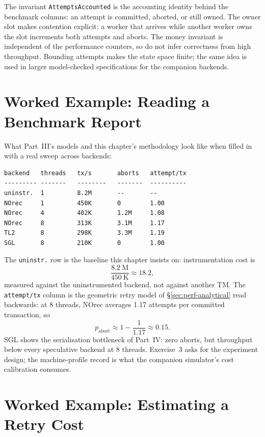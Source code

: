 The invariant \texttt{AttemptsAccounted} is the accounting identity behind the benchmark columns: an attempt is committed, aborted, or still owned. The owner slot makes contention explicit: a worker that arrives while another worker owns the slot increments both attempts and aborts. The money invariant is independent of the performance counters, so do not infer correctness from high throughput. Bounding attempts makes the state space finite; the same idea is used in larger model-checked specifications for the companion backends.

\section{Worked Example: Reading a Benchmark Report}
\label{sec:perf-example}

What Part~III's models and this chapter's methodology look like when filled in
with a real sweep across backends:

\begin{lstlisting}[caption={A protocol for separating instrumentation cost from contention.}]
backend   threads   tx/s       aborts   attempt/tx
--------- -------   --------   -------  ----------
uninstr.  1         8.2M       --       --
NOrec     1         450K       0        1.00
NOrec     4         402K       1.2M     1.08
NOrec     8         313K       3.1M     1.17
TL2       8         298K       3.3M     1.19
SGL       8         210K       0        1.00
\end{lstlisting}

The \texttt{uninstr.} row is the baseline this chapter insists on: instrumentation cost is
$$
\frac{8.2\ \mathrm{M}}{450\ \mathrm{K}} \approx 18.2,
$$
measured against the uninstrumented backend, not against another TM. The \texttt{attempt/tx} column is the geometric retry model of \S\ref{sec:perf-analytical} read backwards: at 8 threads, NOrec averages 1.17 attempts per committed transaction, so
$$
p_{\mathrm{abort}} \approx 1 - \frac{1}{1.17} \approx 0.15.
$$
SGL shows the serialisation bottleneck of Part~IV: zero aborts, but throughput below every speculative backend at 8 threads. Exercise~3 asks for the experiment design; the machine-profile record is what the companion simulator's cost calibration consumes.

\section{Worked Example: Estimating a Retry Cost}

